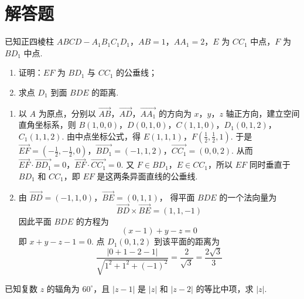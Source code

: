 \section{解答题}
\begin{problem}
已知正四棱柱 \(ABCD-A_{1}B_{1}C_{1}D_{1}\)，\(AB = 1\)，\(AA_{1} = 2\)，\(E\) 为 \(CC_{1}\) 中点，\(F\) 为 \(BD_{1}\) 中点.

\begin{enumerate}
\item 证明：\(EF\) 为 \(BD_{1}\) 与 \(CC_{1}\) 的公垂线；
\item 求点 \(D_{1}\) 到面 \(BDE\) 的距离.
\end{enumerate}

\end{problem}

\begin{solution}
\begin{enumerate}
\item 以 \(A\) 为原点，分别以 \(\overrightarrow{AB}\)，\(\overrightarrow{AD}\)，\(\overrightarrow{AA_{1}}\) 的方向为 \(x\)，\(y\)，\(z\) 轴正方向，建立空间直角坐标系，则
\(B(1,0,0)\)，\(D(0,1,0)\)，\(C(1,1,0)\)，\(D_{1}(0,1,2)\)，\(C_{1}(1,1,2)\).
由中点坐标公式，得
\(E(1,1,1)\)，\(F\left(\frac12,\frac12,1\right)\).
于是
\(\overrightarrow{EF}=\left(-\frac12,-\frac12,0\right)\)，\(\overrightarrow{BD_{1}}=(-1,1,2)\)，\(\overrightarrow{CC_{1}}=(0,0,2)\).
从而
\(\overrightarrow{EF}\cdot\overrightarrow{BD_{1}}=0\)，\(\overrightarrow{EF}\cdot\overrightarrow{CC_{1}}=0\).
又 \(F\in BD_{1}\)，\(E\in CC_{1}\)，所以 \(EF\) 同时垂直于 \(BD_{1}\) 和 \(CC_{1}\)，即 \(EF\) 是这两条异面直线的公垂线.
\item 由
\(\overrightarrow{BD}=(-1,1,0)\)，\(\overrightarrow{BE}=(0,1,1)\)，
得平面 \(BDE\) 的一个法向量为
\[
\overrightarrow{BD}\times\overrightarrow{BE}=(1,1,-1)
\]
因此平面 \(BDE\) 的方程为
\[
(x-1)+y-z=0
\]
即 \(x+y-z-1=0\). 点 \(D_{1}(0,1,2)\) 到该平面的距离为
\[
\frac{|0+1-2-1|}{\sqrt{1^{2}+1^{2}+(-1)^{2}}}
=\frac{2}{\sqrt3}=\frac{2\sqrt3}{3}
\]
\end{enumerate}
\end{solution}

\begin{problem}
已知复数 \(z\) 的辐角为 \(60^{\circ}\)，且 \(|z - 1|\) 是 \(|z|\) 和 \(|z - 2|\) 的等比中项，求 \(|z|\).
\end{problem}

